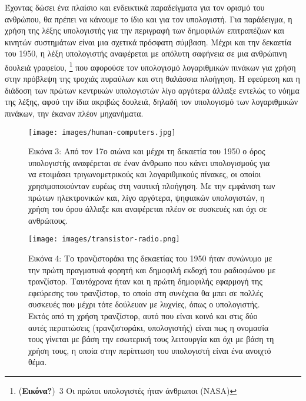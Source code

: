 \documentclass[
]{article}
\begin{document}
Έχοντας δώσει ένα πλαίσιο και ενδεικτικά παραδείγματα για τον ορισμό του
ανθρώπου, θα πρέπει να κάνουμε το ίδιο και για τον υπολογιστή. Για
παράδειγμα, η χρήση της λέξης υπολογιστής για την περιγραφή των
δημοφιλών επιτραπέζιων και κινητών συστημάτων είναι μια σχετικά πρόσφατη
σύμβαση. Μέχρι και την δεκαετία του 1950, η λέξη υπολογιστής αναφέρεται
με απόλυτη σαφήνεια σε μια ανθρώπινη δουλειά γραφείου, \footnote{(\textbf{Εικόνα?})~3
  Οι πρώτοι υπολογιστές ήταν άνθρωποι (NASA)} που αφορούσε τον
υπολογισμό λογαριθμικών πινάκων για χρήση στην πρόβλεψη της τροχιάς
πυραύλων και στη θαλάσσια πλοήγηση. Η εφεύρεση και η διάδοση των πρώτων
κεντρικών υπολογιστών λίγο αργότερα άλλαξε εντελώς το νόημα της λέξης,
αφού την ίδια ακριβώς δουλειά, δηλαδή τον υπολογισμό των λογαριθμικών
πινάκων, την έκαναν πλέον μηχανήματα.

\leavevmode{}%
\begin{figure}
\hypertarget{fig:human-computers}{%
\centering
\texttt{[image: images/human-computers.jpg]}
\caption{Εικόνα 3: Από τον 17ο αιώνα και μέχρι τη δεκαετία του 1950 ο
όρος υπολογιστής αναφέρεται σε έναν άνθρωπο που κάνει υπολογισμούς για
να ετοιμάσει τριγωνομετρικούς και λογαριθμικούς πίνακες, οι οποίοι
χρησιμοποιούνταν ευρέως στη ναυτική πλοήγηση. Με την εμφάνιση των πρώτων
ηλεκτρονικών και, λίγο αργότερα, ψηφιακών υπολογιστών, η χρήση του όρου
άλλαξε και αναφέρεται πλέον σε συσκευές και όχι σε
ανθρώπους.}\label{fig:human-computers}
}
\end{figure}

\leavevmode{}%
\begin{figure}
\hypertarget{fig:transistor-radio}{%
\centering
\texttt{[image: images/transistor-radio.png]}
\caption{Εικόνα 4: Το τρανζιστοράκι της δεκαετίας του 1950 ήταν συνώνυμο
με την πρώτη πραγματικά φορητή και δημοφιλή εκδοχή του ραδιοφώνου με
τρανζίστορ. Ταυτόχρονα ήταν και η πρώτη δημοφιλής εφαρμογή της εφεύρεσης
του τρανζίστορ, το οποίο στη συνέχεια θα μπει σε πολλές συσκευές που
μέχρι τότε δούλευαν με λυχνίες, όπως ο υπολογιστής. Εκτός από τη χρήση
τρανζίστορ, αυτό που είναι κοινό και στις δύο αυτές περιπτώσεις
(τρανζιστοράκι, υπολογιστής) είναι πως η ονομασία τους γίνεται με βάση
την εσωτερική τους λειτουργία και όχι με βάση τη χρήση τους, η οποία
στην περίπτωση του υπολογιστή είναι ένα ανοιχτό
θέμα.}\label{fig:transistor-radio}
}
\end{figure}
\end{document}
